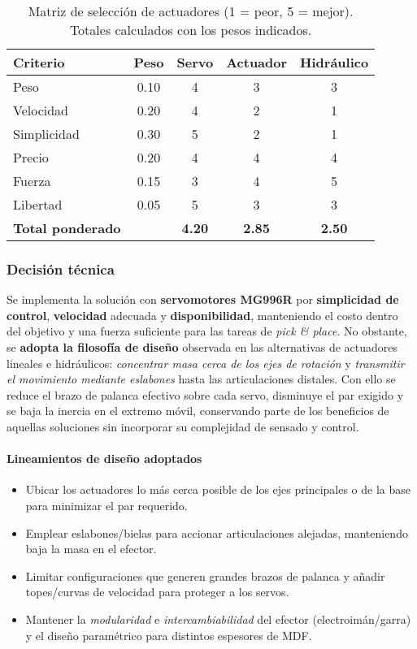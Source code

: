 \begin{table}[h!]
\centering
\begin{tabular}{l c c c c}
\toprule
\textbf{Criterio} & \textbf{Peso} & \textbf{Servo} & \textbf{Actuador} & \textbf{Hidráulico} \\
\midrule
Peso        & 0.10 & 4 & 3 & 3 \\
Velocidad   & 0.20 & 4 & 2 & 1 \\
Simplicidad & 0.30 & 5 & 2 & 1 \\
Precio      & 0.20 & 4 & 4 & 4 \\
Fuerza      & 0.15 & 3 & 4 & 5 \\
Libertad    & 0.05 & 5 & 3 & 3 \\
\midrule
\textbf{Total ponderado} &       & \textbf{4.20} & \textbf{2.85} & \textbf{2.50} \\
\bottomrule
\end{tabular}
\caption{Matriz de selección de actuadores (1 = peor, 5 = mejor). Totales calculados con los pesos indicados.}
\end{table}

\newpage

\subsubsection*{Decisión técnica}
Se implementa la solución con \textbf{servomotores MG996R} por \textbf{simplicidad de control}, \textbf{velocidad} adecuada y \textbf{disponibilidad}, manteniendo el costo dentro del objetivo y una fuerza suficiente para las tareas de \emph{pick \& place}. 
No obstante, se \textbf{adopta la filosofía de diseño} observada en las alternativas de actuadores lineales e hidráulicos: 
\emph{concentrar masa cerca de los ejes de rotación} y \emph{transmitir el movimiento mediante eslabones} hasta las articulaciones distales. 
Con ello se reduce el brazo de palanca efectivo sobre cada servo, disminuye el par exigido y se baja la inercia en el extremo móvil, 
conservando parte de los beneficios de aquellas soluciones sin incorporar su complejidad de sensado y control.

\paragraph{Lineamientos de diseño adoptados}
\begin{itemize}
  \item Ubicar los actuadores lo más cerca posible de los ejes principales o de la base para minimizar el par requerido.
  \item Emplear eslabones/bielas para accionar articulaciones alejadas, manteniendo baja la masa en el efector.
  \item Limitar configuraciones que generen grandes brazos de palanca y añadir topes/curvas de velocidad para proteger a los servos.
  \item Mantener la \emph{modularidad} e \emph{intercambiabilidad} del efector (electroimán/garra) y el diseño paramétrico para distintos espesores de MDF.\@
\end{itemize}

